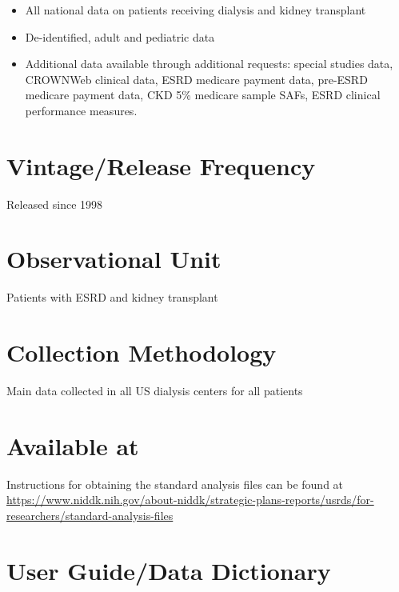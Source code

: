 \documentclass[
]{book}
\providecommand{\tightlist}{%
  \setlength{\itemsep}{0pt}\setlength{\parskip}{0pt}}
\begin{document}
\begin{itemize}
\tightlist
\item
  All national data on patients receiving dialysis and kidney transplant
\item
  De-identified, adult and pediatric data
\item
  Additional data available through additional requests: special studies data, CROWNWeb clinical data, ESRD medicare payment data, pre-ESRD medicare payment data, CKD 5\% medicare sample SAFs, ESRD clinical performance measures.
\end{itemize}

\hypertarget{vintagerelease-frequency-93}{%
\section{Vintage/Release Frequency}\label{vintagerelease-frequency-93}}

Released since 1998

\hypertarget{observational-unit-93}{%
\section{Observational Unit}\label{observational-unit-93}}

Patients with ESRD and kidney transplant

\hypertarget{collection-methodology-93}{%
\section{Collection Methodology}\label{collection-methodology-93}}

Main data collected in all US dialysis centers for all patients

\hypertarget{available-at-93}{%
\section{Available at}\label{available-at-93}}

Instructions for obtaining the standard analysis files can be found at \url{https://www.niddk.nih.gov/about-niddk/strategic-plans-reports/usrds/for-researchers/standard-analysis-files}

\hypertarget{user-guidedata-dictionary-93}{%
\section{User Guide/Data Dictionary}\label{user-guidedata-dictionary-93}}
\end{document}
